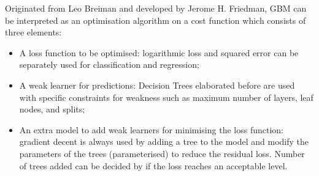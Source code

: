 \begin{defn}\label{Definition of Gradient Boosting}
Originated from Leo Breiman and developed by Jerome H. Friedman, GBM can be interpreted as an optimisation algorithm on a cost function which consists of three elements:
\begin{itemize}
   \item A loss function to be optimised: logarithmic loss and squared error can be separately used for classification and regression;
   \item A weak learner for predictions: Decision Trees elaborated before are used with specific constraints for weakness such as maximum number of layers, leaf nodes, and splits;
   \item An extra model to add weak learners for minimising the loss function: gradient decent is always used by adding a tree to the model and modify the parameters of the trees (parameterised) to reduce the residual loss. Number of trees added can be decided by if the loss reaches an acceptable level. 
   \end{itemize}
\end{defn}

\squeezeup

